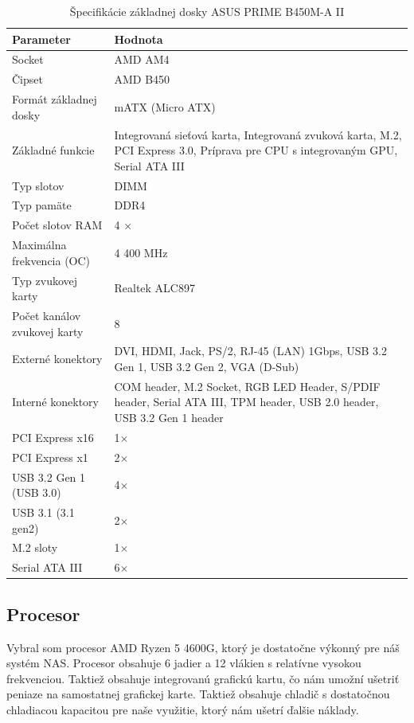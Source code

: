 \documentclass[12pt,oneside,slovak,a4paper]{article}
\begin{document}
\begin{table}[h]
\centering
\begin{tabularx}{\linewidth}{|l|X|}
\hline
\textbf{Parameter} & \textbf{Hodnota} \\ \hline
Socket & AMD AM4 \\ \hline
Čipset & AMD B450 \\ \hline
Formát základnej dosky & mATX (Micro ATX) \\ \hline
Základné funkcie & Integrovaná sieťová karta, Integrovaná zvuková karta, M.2, PCI Express 3.0, Príprava pre CPU s integrovaným GPU, Serial ATA III \\ \hline
Typ slotov & DIMM \\ \hline
Typ pamäte & DDR4 \\ \hline
Počet slotov RAM & 4 × \\ \hline
Maximálna frekvencia (OC) & 4 400 MHz \\ \hline
Typ zvukovej karty & Realtek ALC897 \\ \hline
Počet kanálov zvukovej karty & 8 \\ \hline
Externé konektory & DVI, HDMI, Jack, PS/2, RJ-45 (LAN) 1Gbps, USB 3.2 Gen 1, USB 3.2 Gen 2, VGA (D-Sub) \\ \hline
Interné konektory & COM header, M.2 Socket, RGB LED Header, S/PDIF header, Serial ATA III, TPM header, USB 2.0 header, USB 3.2 Gen 1 header \\ \hline
PCI Express x16 & 1× \\ \hline
PCI Express x1 & 2× \\ \hline
USB 3.2 Gen 1 (USB 3.0) & 4× \\ \hline
USB 3.1 (3.1 gen2) & 2× \\ \hline
M.2 sloty & 1× \\ \hline
Serial ATA III & 6× \\ \hline
\end{tabularx}
\caption{Špecifikácie základnej dosky ASUS PRIME B450M-A II}
\end{table}

\subsection{Procesor}
Vybral som procesor AMD Ryzen 5 4600G, ktorý je dostatočne výkonný pre náš systém NAS. Procesor obsahuje 6 jadier a 12 vlákien s relatívne vysokou frekvenciou. Taktiež obsahuje integrovanú grafickú kartu, čo nám umožní ušetriť peniaze na samostatnej grafickej karte. Taktiež obsahuje chladič s dostatočnou chladiacou kapacitou pre naše využitie, ktorý nám ušetrí ďalšie náklady.
\end{document}
